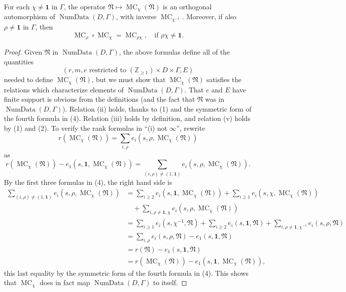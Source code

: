For each \(\chi\ne\mathbf{1}\) in \(\Gamma\), the operator \(\mathfrak{N}\mapsto\operatorname{MC}_\chi(\mathfrak{N})\) is an orthogonal automorphism of \(\operatorname{NumData}(D,\Gamma)\), with inverse \(\operatorname{MC}_{\chi^{-1}}\). Moreover, if also \(\rho\ne\mathbf{1}\) in \(\Gamma\), then
\[
\operatorname{MC}_\rho\circ\operatorname{MC}_\chi=\operatorname{MC}_{\rho\chi},\quad\text{if }\rho\chi\ne\mathbf{1}.
\]
\begin{proof}
Given \(\mathfrak{N}\) in \(\operatorname{NumData}(D,\Gamma)\), the above formulas define all of the quantities
\[
(r,m,e\text{ restricted to }(\mathbb{Z}_{\geq 1})\times D\times\Gamma,E)
\]
needed to define \(\operatorname{MC}_\chi(\mathfrak{N})\), but we must show that \(\operatorname{MC}_\chi(\mathfrak{N})\) satisfies the relations which characterize elements of \(\operatorname{NumData}(D,\Gamma)\). That \(e\) and \(E\) have finite support is obvious from the definitions (and the fact that \(\mathfrak{N}\) was in \(\operatorname{NumData}(D,\Gamma)\)). Relation (ii) holds, thanks to (1) and the symmetric form of the fourth formula in (4). Relation (iii) holds by definition, and relation (v) holds by (1) and (2). To verify the rank formulas in ``(i) not \(\infty\)'', rewrite
\[
r(\operatorname{MC}_\chi(\mathfrak{N}))=\sum_{i,\rho}e_i(s,\rho,\operatorname{MC}_\chi(\mathfrak{N}))
\]
as
\[
r(\operatorname{MC}_\chi(\mathfrak{N}))-e_1(s,\mathbf{1},\operatorname{MC}_\chi(\mathfrak{N}))
=\sum_{(i,\rho)\ne(1,\mathbf{1})}e_i(s,\rho,\operatorname{MC}_\chi(\mathfrak{N})).
\]
By the first three formulas in (4), the right hand side is
\[
\begin{aligned}
\sum_{(i,\rho)\ne(1,\mathbf{1})}e_i(s,\rho,\operatorname{MC}_\chi(\mathfrak{N}))
&=\sum_{i\geq2}e_i(s,\mathbf{1},\operatorname{MC}_\chi(\mathfrak{N}))
 +\sum_{i\geq1}e_i(s,\chi,\operatorname{MC}_\chi(\mathfrak{N}))\\
&\quad+\sum_{i,\rho\ne\mathbf{1},\chi}e_i(s,\rho,\operatorname{MC}_\chi(\mathfrak{N}))\\
&=\sum_{i\geq1}e_i(s,\chi^{-1},\mathfrak{N})
 +\sum_{i\geq2}e_i(s,\mathbf{1},\mathfrak{N})
 +\sum_{i,\rho\ne\mathbf{1},\chi^{-1}}e_i(s,\rho,\mathfrak{N})\\
&=\sum_{i,\rho}e_i(s,\rho,\mathfrak{N})-e_1(s,\mathbf{1},\mathfrak{N})\\
&=r(\mathfrak{N})-e_1(s,\mathbf{1},\mathfrak{N})\\
&=r(\operatorname{MC}_\chi(\mathfrak{N}))-e_1(s,\mathbf{1},\operatorname{MC}_\chi(\mathfrak{N})),
\end{aligned}
\]
this last equality by the symmetric form of the fourth formula in (4). This shows that \(\operatorname{MC}_\chi\) does in fact map \(\operatorname{NumData}(D,\Gamma)\) to itself.


\end{proof}
